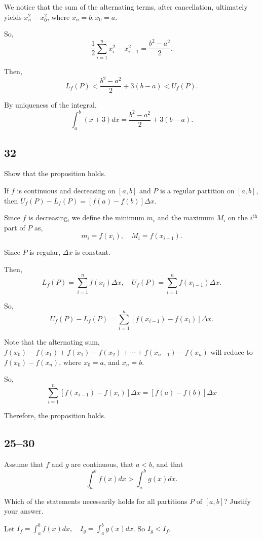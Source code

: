 \documentclass[../hw5.tex]{subfiles}
\begin{document}
We notice that the sum of the alternating terms, after cancellation, ultimately yields $x_n^2-x_0^2$, where $x_n=b,x_0=a$.

So, \[\frac{1}{2} \sum_{i=1}^{n} x_i^2-x_{i-1}^2 = \frac{b^2-a^2}{2}.\]

Then, \[L_f(P)< \frac{b^2-a^2}{2} + 3(b-a) <U_f(P).\]

By uniqueness of the integral,
\[\int_{a}^{b} (x+3) dx = \frac{b^2-a^2}{2} + 3(b-a).\]


\subsection*{32}
Show that the proposition holds.

\begin{proposition}
    If $f$ is continuous and decreasing on $[a,b]$ and $P$ is a regular partition on $[a,b]$, 
    then $U_f(P)-L_f(P)=[f(a)-f(b)]\Delta x$.
\end{proposition}

Since $f$ is decreasing, we define the minimum $m_i$ and the maximum $M_i$ on the $i^{\text{th}}$ part of $P$ as, \[m_i=f(x_i), \quad M_i = f(x_{i-1}).\]

Since $P$ is regular, $\Delta x$ is constant.

Then, \[L_f(P)=\sum_{i=1}^{n} f(x_i) \Delta x, \quad U_f(P)=\sum_{i=1}^{n} f(x_{i-1}) \Delta x.\]

So, \[U_f(P)-L_f(P) = \sum_{i=1}^{n} \left[ f(x_{i-1}) - f(x_i) \right] \Delta x.\]

Note that the alternating sum, $f(x_0) - f(x_1)+f(x_1)-f(x_2)+\cdots+f(x_{n-1})-f(x_n)$ will reduce to $f(x_0)-f(x_n)$, where $x_0=a$, and $x_n=b$.

So, \[\sum_{i=1}^{n} \left[ f(x_{i-1}) - f(x_i) \right] \Delta x = \left[ f(a) - f(b) \right] \Delta x\]

Therefore, the proposition holds.

\subsection*{25--30}
Assume that $f$ and $g$ are continuous, that $a<b$, and that \[\int_{a}^{b} f(x)dx > \int_{a}^{b} g(x)dx.\]

Which of the statements necessarily holds for all partitions $P$ of $[a,b]$? 
Justify your answer.

Let $I_f = \int_{a}^{b} f(x)dx, \quad  I_g = \int_{a}^{b} g(x)dx$. So $I_g < I_f$.
\end{document}
